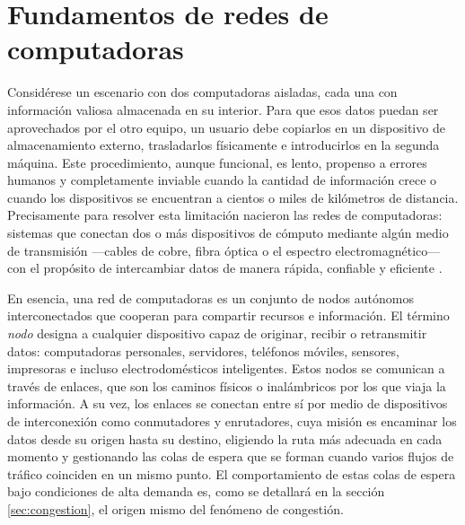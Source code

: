 \documentclass[12pt]{report}
\begin{document}
\section{Fundamentos de redes de computadoras}
\label{sec:fundamentos_redes}

Considérese un escenario con dos computadoras aisladas, cada una con información valiosa almacenada en su interior. Para que esos datos puedan ser aprovechados por el otro equipo, un usuario debe copiarlos en un dispositivo de almacenamiento externo, trasladarlos físicamente e introducirlos en la segunda máquina. Este procedimiento, 
aunque funcional, es lento, propenso a errores humanos y completamente inviable cuando la cantidad de información crece o cuando los dispositivos se encuentran a cientos o miles de kilómetros de distancia. Precisamente para resolver esta limitación nacieron las redes de computadoras: sistemas que conectan dos o más dispositivos de 
cómputo mediante algún medio de transmisión —cables de cobre, fibra óptica o el espectro electromagnético— con el propósito de intercambiar datos de manera rápida, confiable y eficiente \cite{tanenbaum2011}.

En esencia, una red de computadoras es un conjunto de nodos autónomos interconectados que cooperan para compartir recursos e información. El término \textit{nodo} designa a cualquier dispositivo capaz de originar, recibir o retransmitir datos: computadoras personales, servidores, teléfonos móviles, sensores, impresoras e incluso 
electrodomésticos inteligentes. Estos nodos se comunican a través de enlaces, que son los caminos físicos o inalámbricos por los que viaja la información. A su vez, los enlaces se conectan entre sí por medio de dispositivos de interconexión como conmutadores y enrutadores, cuya misión es encaminar los datos desde su origen hasta su 
destino, eligiendo la ruta más adecuada en cada momento y gestionando las colas de espera que se forman cuando varios flujos de tráfico coinciden en un mismo punto. El comportamiento de estas colas de espera bajo condiciones de alta demanda es, como se detallará en la sección \ref{sec:congestion}, el origen mismo del fenómeno de congestión.
\end{document}
